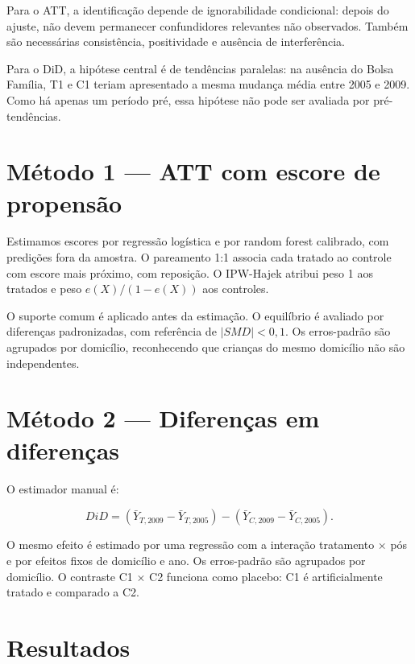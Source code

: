 \documentclass[12pt,a4paper]{article}
\begin{document}
Para o ATT, a identificação depende de ignorabilidade condicional: depois do ajuste, não devem permanecer confundidores relevantes não observados. Também são necessárias consistência, positividade e ausência de interferência.

Para o DiD, a hipótese central é de tendências paralelas: na ausência do Bolsa Família, T1 e C1 teriam apresentado a mesma mudança média entre 2005 e 2009. Como há apenas um período pré, essa hipótese não pode ser avaliada por pré-tendências.

\section{Método 1 --- ATT com escore de propensão}

Estimamos escores por regressão logística e por random forest calibrado, com predições fora da amostra. O pareamento 1:1 associa cada tratado ao controle com escore mais próximo, com reposição. O IPW-Hajek atribui peso 1 aos tratados e peso $e(X)/(1-e(X))$ aos controles.

O suporte comum é aplicado antes da estimação. O equilíbrio é avaliado por diferenças padronizadas, com referência de $|SMD|<0{,}1$. Os erros-padrão são agrupados por domicílio, reconhecendo que crianças do mesmo domicílio não são independentes.

\section{Método 2 --- Diferenças em diferenças}

O estimador manual é:

\begin{equation}
\widehat{DiD} = (\bar Y_{T,2009}-\bar Y_{T,2005}) - (\bar Y_{C,2009}-\bar Y_{C,2005}).
\end{equation}

O mesmo efeito é estimado por uma regressão com a interação tratamento $\times$ pós e por efeitos fixos de domicílio e ano. Os erros-padrão são agrupados por domicílio. O contraste C1 $\times$ C2 funciona como placebo: C1 é artificialmente tratado e comparado a C2.

\section{Resultados}
\end{document}
